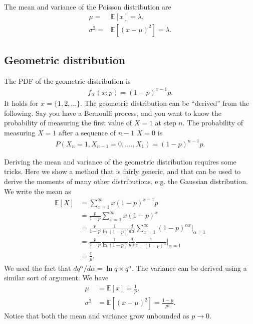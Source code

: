 The mean and variance of the Poisson distribution are
\begin{align}
    \mu
    =&
    \mathbb{E}\left[x\right]
    =
    \lambda
    ,\\
    \sigma^2
    =&
    \mathbb{E}\left[\left(x-\mu\right)^2\right]
    =
    \lambda
    .
\end{align}

\subsection{Geometric distribution}
The PDF of the geometric distribution is
\begin{align}
    f_X\left(x;p\right)
    =
    \left(1-p\right)^{x-1}p
    .
\end{align}
It holds for $x=\{1,2,...\}$.
The geometric distribution can be ``derived'' from the following. 
Say you have a Bernoulli process, and you want to know the probability of measuring the first value of $X=1$ at step $n$.
The probability of measuring $X=1$ after a sequence of $n-1$ $X=0$ is
\begin{align}
    P\left(X_n=1,X_{n-1}=0,....,X_{1}\right) = \left(1-p\right)^{n-1} p
    .
\end{align}

Deriving the mean and variance of the geometric distribution requires some tricks.
Here we show a method that is fairly generic, and that can be used to derive the moments of many other distributions, e.g. the Gaussian distribution.
We write the mean as
\begin{align}
    \mathbb{E}\left[X\right]
    &=
    \sum_{x=1}^{\infty} x \left(1-p\right)^{x-1}p
    \nonumber\\
    &=
    \frac{p}{1-p}\sum_{x=1}^{\infty} x \left(1-p\right)^x
    \nonumber\\
    &=
    \frac{p}{1-p}\frac{1}{\ln\left(1-p\right)} \frac{d}{d\alpha}\sum_{x=1}^{\infty}\left(1-p\right)^{\alpha x}\Big|_{\alpha=1}
    \nonumber\\
    &=
    \frac{p}{1-p}\frac{1}{\ln\left(1-p\right)} \frac{d}{d\alpha}\frac{1}{1-\left(1-p\right)^{\alpha}}\Big|_{\alpha=1}
    \nonumber\\
    &=
    \frac{1}{p}
    .
\end{align}
We used the fact that $d q^{\alpha}/d\alpha = \ln q \times q^{\alpha}$.
The variance can be derived using a similar sort of argument.
We have
\begin{align}
    \mu
    &=
    \mathbb{E}\left[x\right]
    =
    \frac{1}{p}
    ,\\
    \sigma^2
    &=
    \mathbb{E}\left[\left(x-\mu\right)^2\right]
    =
    \frac{1-p}{p^2}
    .
\end{align}
Notice that both the mean and variance grow unbounded as $p\to0$.
